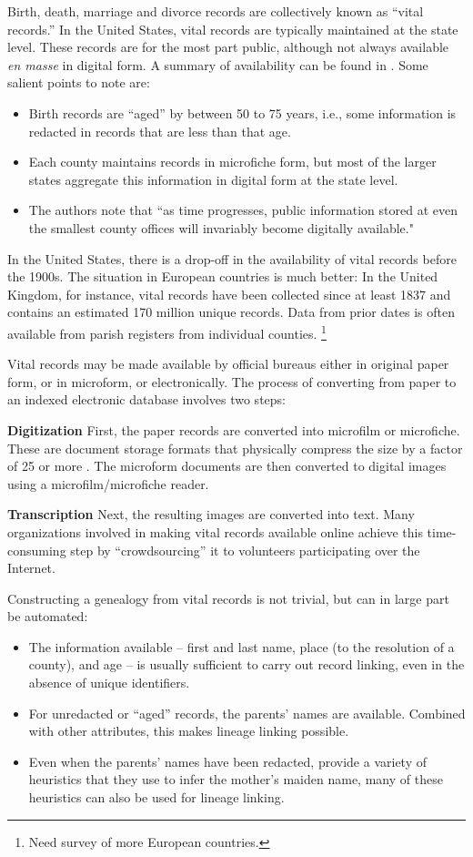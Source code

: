 \documentclass{article}
\begin{document}
Birth, death, marriage  and divorce records are collectively known as ``vital records.'' In the United States, vital records are typically maintained at the state level. These records are for the most part public, although not always available {\em en masse} in digital form. A summary of availability can be found in \cite{messing}. Some salient points to note are:
\begin{itemize}
\item
Birth records are ``aged'' by between 50 to 75 years, i.e., some information is redacted in records that are less than that age.
\item
Each county maintains records in microfiche form, but most of the larger states aggregate this information in digital form at the state level. 
\item
The authors note that ``as time progresses, public information stored at even the smallest county offices will invariably become digitally available."
\end{itemize}

In the United States, there is a drop-off in the availability of vital records before the 1900s. The situation in European countries is much better: In the United Kingdom, for instance, vital records have been collected since at least 1837 \cite{ukbmd.org.uk} and contains an estimated 170 million unique records. Data from prior dates is often available from parish registers from individual counties. \footnote{Need survey of more European countries.} 

Vital records may be made available by official bureaus either in original paper form, or in microform, or electronically. The process of converting from paper to an indexed electronic database involves two steps:

{\bf Digitization} First, the paper records are converted into microfilm or microfiche. These are document storage formats that physically compress the size by a factor of 25 or more \cite{wp-microform}. The microform documents are then converted to digital images using a microfilm/microfiche reader. 

{\bf Transcription} Next, the resulting images are converted into text. Many organizations involved in making vital records available online achieve this time-consuming step by ``crowdsourcing'' it to volunteers participating over the Internet.

Constructing a genealogy from vital records is not trivial, but can in large part be automated: 
\begin{itemize}
\item
The information available -- first and last name, place (to the resolution of a county), and age -- is usually sufficient to carry out record linking, even in the absence of unique identifiers.
\item
For unredacted or ``aged'' records, the parents' names are available. Combined with other attributes, this makes lineage linking possible.
\item
Even when the parents' names have been redacted, \cite{messing} provide a variety of heuristics that they use to infer the mother's maiden name, many of these heuristics can also be used for lineage linking.
\end{itemize}
\end{document}
